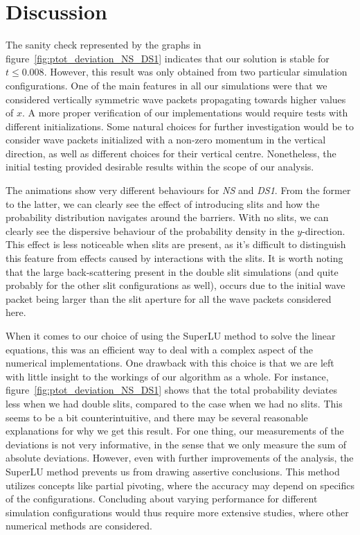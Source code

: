 \section{Discussion}\label{sec:discussion}

The sanity check represented by the graphs in figure~\ref{fig:ptot_deviation_NS_DS1} indicates that our solution is stable for $t\leq 0.008$. However, this result was only obtained from two particular simulation configurations. One of the main features in all our simulations were that we considered vertically symmetric wave packets propagating towards higher values of $x$. A more proper verification of our implementations would require tests with different initializations. Some natural choices for further investigation would be to consider wave packets initialized with a non-zero momentum in the vertical direction, as well as different choices for their vertical centre. Nonetheless, the initial testing provided desirable results within the scope of our analysis. 

The animations show very different behaviours for \textit{NS} and \textit{DS1}. From the former to the latter, we can clearly see the effect of introducing slits and how the probability distribution navigates around the barriers. With no slits, we can clearly see the dispersive behaviour of the probability density in the $y$-direction. This effect is less noticeable when slits are present, as it's difficult to distinguish this feature from effects caused by interactions with the slits. It is worth noting that the large back-scattering present in the double slit simulations (and quite probably for the other slit configurations as well), occurs due to the initial wave packet being larger than the slit aperture for all the wave packets considered here.

When it comes to our choice of using the SuperLU method to solve the linear equations, this was an efficient way to deal with a complex aspect of the numerical implementations. One drawback with this choice is that we are left with little insight to the workings of our algorithm as a whole. For instance, figure~\ref{fig:ptot_deviation_NS_DS1} shows that the total probability deviates less when we had double slits, compared to the case when we had no slits. This seems to be a bit counterintuitive, and there may be several reasonable explanations for why we get this result. For one thing, our measurements of the deviations is not very informative, in the sense that we only measure the sum of absolute deviations. However, even with further improvements of the analysis, the SuperLU method prevents us from drawing assertive conclusions. This method utilizes concepts like partial pivoting, where the accuracy may depend on specifics of the configurations. Concluding about varying performance for different simulation configurations would thus require more extensive studies, where other numerical methods are considered.        






